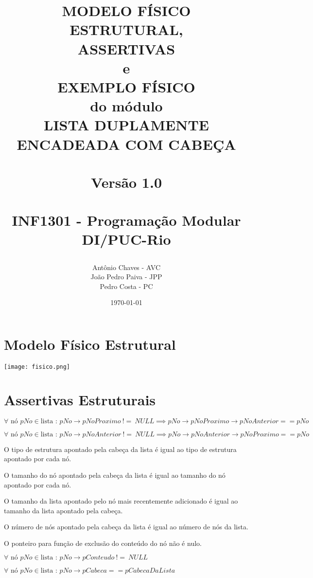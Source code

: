 \documentclass[a4paper,12pt,oneside]{book}
\title{
  \begin{flushright}
  \Huge{MODELO FÍSICO ESTRUTURAL,}\\
  ASSERTIVAS\\
  e\\
  EXEMPLO FÍSICO\\
  do módulo\\
  LISTA DUPLAMENTE\\
  ENCADEADA COM CABEÇA\\
  ~\\
  \LARGE{Versão 1.0}\\
  ~\\
  INF1301 - Programação Modular\\ DI/PUC-Rio
  \end{flushright}
}
\author{Antônio Chaves - AVC\\João Pedro Paiva - JPP\\Pedro Costa - PC}
\date{\today}
\begin{document}
\frontmatter
\maketitle

\tableofcontents



\mainmatter

\chapter{Modelo Físico Estrutural}

\begin{center}

    \texttt{[image: fisico.png]}

\end{center}

\chapter{Assertivas Estruturais}\setlength{\parskip}{1\baselineskip}

\sloppy$\forall \textrm{ nó } pNo \in \textrm{lista : } pNo \rightarrow pNoProximo \ != \ NULL \implies pNo \rightarrow pNoProximo \rightarrow pNoAnterior == pNo$

\noindent\sloppy$\forall \textrm{ nó } pNo \in \textrm{lista : } pNo \rightarrow pNoAnterior \ != \ NULL \implies pNo \rightarrow pNoAnterior \rightarrow pNoProximo == pNo$

\noindent O tipo de estrutura apontado pela cabeça da lista é igual ao tipo de estrutura apontado por cada nó.

\noindent O tamanho do nó apontado pela cabeça da lista é igual ao tamanho do nó apontado por cada nó.

\noindent O tamanho da lista apontado pelo nó mais recentemente adicionado é igual ao tamanho da lista apontado pela cabeça.

\noindent O número de nós apontado pela cabeça da lista é igual ao número de nós da lista.

\noindent O ponteiro para função de exclusão do conteúdo do nó não é nulo.

\noindent\sloppy$\forall \textrm{ nó } pNo \in \textrm{lista : } pNo \rightarrow pConteudo \ != \ NULL$

\noindent\sloppy$\forall \textrm{ nó } pNo \in \textrm{lista : } pNo \rightarrow pCabeca == pCabecaDaLista$
\end{document}
